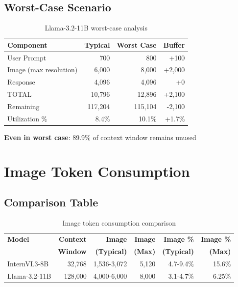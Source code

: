 \documentclass[11pt,a4paper]{article}
\begin{document}
\subsection{Worst-Case Scenario}

\begin{table}[h]
\centering
\small
\begin{tabular}{lrrr}
\toprule
\textbf{Component} & \textbf{Typical} & \textbf{Worst Case} & \textbf{Buffer} \\
\midrule
User Prompt & 700 & 800 & +100 \\
Image (max resolution) & 6,000 & 8,000 & +2,000 \\
Response & 4,096 & 4,096 & +0 \\
\midrule
TOTAL & 10,796 & 12,896 & +2,100 \\
Remaining & 117,204 & 115,104 & -2,100 \\
Utilization \% & 8.4\% & 10.1\% & +1.7\% \\
\bottomrule
\end{tabular}
\caption{Llama-3.2-11B worst-case analysis}
\end{table}

\textbf{Even in worst case}: 89.9\% of context window remains unused

\section{Image Token Consumption}

\subsection{Comparison Table}

\begin{table}[h]
\centering
\small
\begin{tabular}{lrrrrr}
\toprule
\textbf{Model} & \textbf{Context} & \textbf{Image} & \textbf{Image} & \textbf{Image \%} & \textbf{Image \%} \\
& \textbf{Window} & \textbf{(Typical)} & \textbf{(Max)} & \textbf{(Typical)} & \textbf{(Max)} \\
\midrule
InternVL3-8B & 32,768 & 1,536-3,072 & 5,120 & 4.7-9.4\% & 15.6\% \\
Llama-3.2-11B & 128,000 & 4,000-6,000 & 8,000 & 3.1-4.7\% & 6.25\% \\
\bottomrule
\end{tabular}
\caption{Image token consumption comparison}
\end{table}
\end{document}
